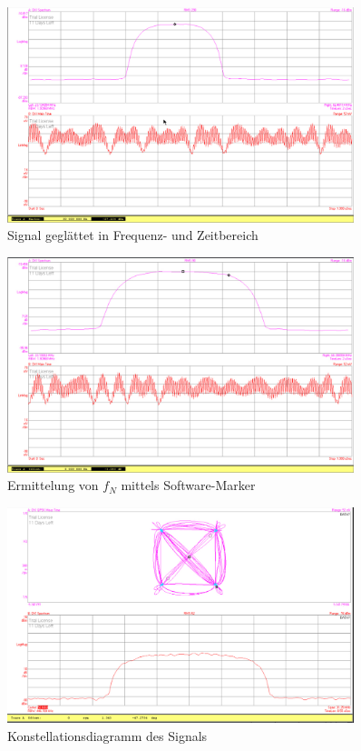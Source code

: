 \documentclass[12pt,a4paper,ngerman]{article}
\begin{document}
\begin{figure}[H]
\centering
\includegraphics[width=0.9\textwidth]{figures/Aufgabe1_QPSK_avg.jpg} 
\caption{Signal geglättet in Frequenz- und Zeitbereich}
\label{fig:1_sig_avg}
\end{figure}



\begin{figure}[H]
\centering
\includegraphics[width=0.9\textwidth]{figures/Aufgabe1_QPSK_fs.jpg} 
\caption{Ermittelung von $f_N$ mittels Software-Marker}
\label{fig:1_fn}
\end{figure}

\pagebreak

\begin{figure}[H]
\centering
\includegraphics[width=0.9\textwidth]{figures/Aufgabe1_QPSK_demod.jpg} 
\caption{Konstellationsdiagramm des Signals}
\label{fig:1_konst}
\end{figure}
\end{document}
